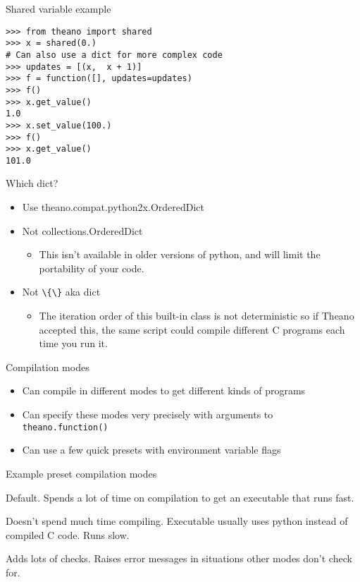 \documentclass[utf8x,hyperref={pdfpagelabels=false}]{beamer}
\newcommand{\code}[1]{\lstinline[emph={[2]}]|#1|}
\begin{document}
\begin{frame}[fragile]{Shared variable example}
\begin{lstlisting}
>>> from theano import shared
>>> x = shared(0.)
# Can also use a dict for more complex code
>>> updates = [(x,  x + 1)]
>>> f = function([], updates=updates)
>>> f()
>>> x.get_value()
1.0
>>> x.set_value(100.)
>>> f()
>>> x.get_value()
101.0
\end{lstlisting}
\end{frame}

\begin{frame}{Which dict?}
  \begin{itemize}
  \item Use theano.compat.python2x.OrderedDict
  \item Not collections.OrderedDict
  \begin{itemize}
  \item This isn’t available in older versions of python, and will limit the portability of your code.
  \end{itemize}
  \item Not \code{\{\}} aka dict
  \begin{itemize}
  \item The iteration order of this built-in class is not deterministic so if Theano accepted this, the same script could compile different C programs each time you run it.
  \end{itemize}
  \end{itemize}
\end{frame}

\begin{frame}{Compilation modes}
  \begin{itemize}
  \item Can compile in different modes to get different kinds of programs
  \item Can specify these modes very precisely with arguments to \code{theano.function()}
  \item Can use a few quick presets with environment variable flags
  \end{itemize}
\end{frame}

\begin{frame}{Example preset compilation modes}
  \begin{description}
  \item[FAST\_RUN] Default. Spends a lot of time on
compilation to get an executable that runs
fast.
  \item[FAST\_COMPILE] Doesn’t spend much time compiling.
Executable usually uses python
instead of compiled C code. Runs slow.
  \item[DEBUG\_MODE] Adds lots of checks.
Raises error messages in situations other modes don't check for.
  \end{description}
\end{frame}
\end{document}
